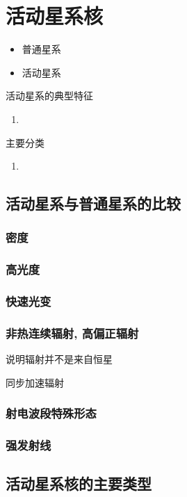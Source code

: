 \newpage
\section{活动星系核}
\begin{itemize}
    \item 普通星系
    \item 活动星系
\end{itemize}

活动星系的典型特征
\begin{enumerate}
    \item 
\end{enumerate}

主要分类
\begin{enumerate}
    \item 
\end{enumerate}

\subsection{活动星系与普通星系的比较}

\subsubsection{密度}
\subsubsection{高光度}
\subsubsection{快速光变}
\subsubsection{非热连续辐射, 高偏正辐射 }
说明辐射并不是来自恒星

同步加速辐射

\subsubsection{射电波段特殊形态}

\subsubsection{强发射线}

\subsection{活动星系核的主要类型}

